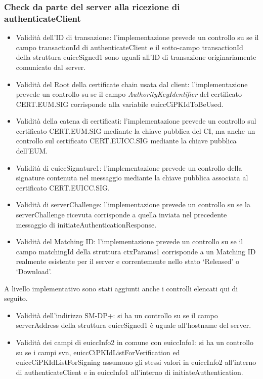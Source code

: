 \documentclass[10pt, oneside]{book}
\begin{document}
\subsubsection{Check da parte del server alla ricezione di authenticateClient}
\begin{itemize}
\item Validità dell'ID di transazione: l'implementazione prevede un controllo su se il campo transactionId di authenticateClient e il sotto-campo transactionId della struttura euiccSigned1 sono uguali all'ID di transazione originariamente comunicato dal server.
\item Validità del Root della certificate chain usata dal client: l'implementazione prevede un controllo su se il campo \textit{AuthorityKeyIdentifier} del certificato CERT.EUM.SIG corrisponde alla variabile euiccCiPKIdToBeUsed.
\item Validità della catena di certificati: l'implementazione prevede un controllo sul certificato CERT.EUM.SIG mediante la chiave pubblica del CI, ma anche un controllo sul certificato CERT.EUICC.SIG mediante la chiave pubblica dell'EUM.
\item Validità di euiccSignature1: l'implementazione prevede un controllo della signature contenuta nel messaggio mediante la chiave pubblica associata al certificato CERT.EUICC.SIG.
\item Validità di serverChallenge: l'implementazione prevede un controllo su se la serverChallenge ricevuta corrisponde a quella inviata nel precedente messaggio di initiateAuthenticationResponse.
\item Validità del Matching ID: l'implementazione prevede un controllo su se il campo matchingId della struttura ctxParams1 corrisponde a un Matching ID realmente esistente per il server e correntemente nello stato `Released' o `Download'.
\end{itemize}
A livello implementativo sono stati aggiunti anche i controlli elencati qui di seguito.
\begin{itemize}
\item Validità dell'indirizzo SM-DP+: si ha un controllo su se il campo serverAddress della struttura euiccSigned1 è uguale all'hostname del server.
\item Validità dei campi di euiccInfo2 in comune con euiccInfo1: si ha un controllo su se i campi svn, euiccCiPKIdListForVerification ed euiccCiPKIdListForSigning assumono gli stessi valori in euiccInfo2 all'interno di authenticateClient e in euiccInfo1 all'interno di initiateAuthentication.
\end{itemize}
\end{document}
